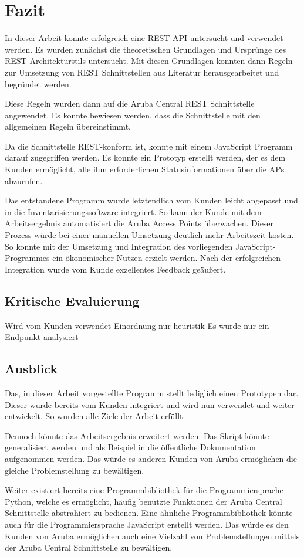 \chapter{Fazit}

In dieser Arbeit konnte erfolgreich eine REST API untersucht und verwendet werden. Es wurden zunächst die theoretischen Grundlagen und Ursprünge des REST Architekturstils untersucht. Mit diesen Grundlagen konnten dann Regeln zur Umsetzung von REST Schnittstellen aus Literatur herausgearbeitet und begründet werden.

Diese Regeln wurden dann auf die Aruba Central REST Schnittstelle angewendet. Es konnte bewiesen werden, dass die Schnittstelle mit den allgemeinen Regeln übereinstimmt.

Da die Schnittstelle REST-konform ist, konnte mit einem JavaScript Programm darauf zugegriffen werden. Es konnte ein Prototyp erstellt werden, der es dem Kunden ermöglicht, alle ihm erforderlichen Statusinformationen über die APs abzurufen.

Das entstandene Programm wurde letztendlich vom Kunden leicht angepasst und in die Inventarisierungssoftware integriert. So kann der Kunde mit dem Arbeitsergebnis automatisiert die Aruba Access Points überwachen. Dieser Prozess würde bei einer manuellen Umsetzung deutlich mehr Arbeitszeit kosten. So konnte mit der Umsetzung und Integration des vorliegenden JavaScript-Programmes ein ökonomischer Nutzen erzielt werden. Nach der erfolgreichen Integration wurde vom Kunde exzellentes Feedback geäußert.

\section{Kritische Evaluierung}

Wird vom Kunden verwendet
Einordnung nur heuristik
Es wurde nur ein Endpunkt analysiert

\section{Ausblick}

Das, in dieser Arbeit vorgestellte Programm stellt lediglich einen Prototypen dar. Dieser wurde bereits vom Kunden integriert und wird nun verwendet und weiter entwickelt. So wurden alle Ziele der Arbeit erfüllt. 

Dennoch könnte das Arbeitsergebnis erweitert werden: Das Skript könnte generalisiert werden und als Beispiel in die öffentliche Dokumentation aufgenommen werden. Das würde es anderen Kunden von Aruba ermöglichen die gleiche Problemstellung zu bewältigen.

Weiter existiert bereits eine Programmbibliothek für die Programmiersprache Python, welche es ermöglicht, häufig benutzte Funktionen der Aruba Central Schnittstelle abstrahiert zu bedienen. Eine ähnliche Programmbibliothek könnte auch für die Programmiersprache JavaScript erstellt werden. Das würde es den Kunden von Aruba ermöglichen auch eine Vielzahl von Problemstellungen mittels der Aruba Central Schnittstelle zu bewältigen.
